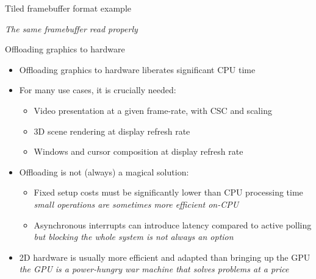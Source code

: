 \begin{frame}{Tiled framebuffer format example}
\begin{minipage}[b]{0.45\textwidth}
    \textit{\small The same framebuffer read properly}
  \end{minipage}
\end{frame}

\begin{frame}{Offloading graphics to hardware}
  \begin{itemize}
  \item Offloading graphics to hardware liberates significant CPU time
  \item For many use cases, it is crucially needed:
    \begin{itemize}
    \item Video presentation at a given frame-rate, with CSC and scaling
    \item 3D scene rendering at display refresh rate
    \item Windows and cursor composition at display refresh rate
    \end{itemize}
  \item Offloading is not (always) a magical solution:
    \begin{itemize}
    \item Fixed setup costs must be significantly lower than CPU processing time\\
      \textit{small operations are sometimes more efficient on-CPU}
    \item Asynchronous interrupts can introduce latency compared to active polling\\
      \textit{but blocking the whole system is not always an option}
    \end{itemize}
  \item 2D hardware is usually more efficient and adapted than bringing up the GPU\\
    \textit{the GPU is a power-hungry war machine that solves problems at a price}
  \end{itemize}
\end{frame}

